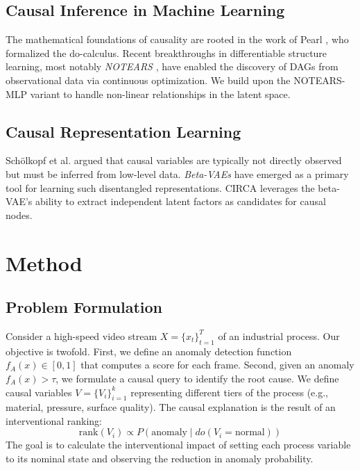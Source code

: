 \documentclass{article}
\begin{document}
\subsection{Causal Inference in Machine Learning}
The mathematical foundations of causality are rooted in the work of Pearl \cite{pearl2009causality}, who formalized the do-calculus. Recent breakthroughs in differentiable structure learning, most notably \emph{NOTEARS} \cite{zheng2018dags}, have enabled the discovery of DAGs from observational data via continuous optimization. We build upon the NOTEARS-MLP variant to handle non-linear relationships in the latent space.

\subsection{Causal Representation Learning}
Sch{\"o}lkopf et al. \cite{scholkopf2021toward} argued that causal variables are typically not directly observed but must be inferred from low-level data. \emph{Beta-VAEs} \cite{higgins2017beta} have emerged as a primary tool for learning such disentangled representations. CIRCA leverages the beta-VAE's ability to extract independent latent factors as candidates for causal nodes.

\section{Method}

\subsection{Problem Formulation}
Consider a high-speed video stream $X = \{x_t\}_{t=1}^T$ of an industrial process. Our objective is twofold. First, we define an anomaly detection function $f_A(x) \in [0,1]$ that computes a score for each frame. Second, given an anomaly $f_A(x) > \tau$, we formulate a causal query to identify the root cause. We define causal variables $V = \{V_i\}_{i=1}^k$ representing different tiers of the process (e.g., material, pressure, surface quality). The causal explanation is the result of an interventional ranking:
\begin{equation}
    \text{rank}(V_i) \propto P(\text{anomaly} \mid do(V_i = \text{normal}))
\end{equation}
The goal is to calculate the interventional impact of setting each process variable to its nominal state and observing the reduction in anomaly probability.
\end{document}
